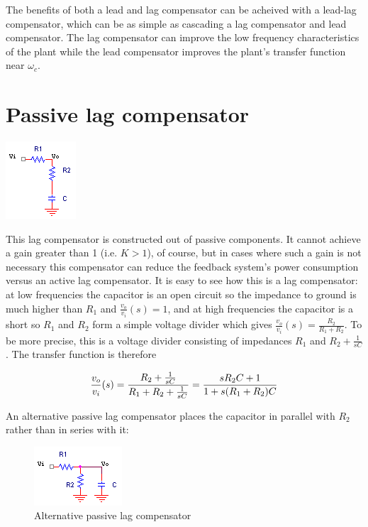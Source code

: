 The benefits of both a lead and lag compensator can be acheived with a lead-lag compensator, which can be as simple as cascading a lag compensator and lead compensator.
The lag compensator can improve the low frequency characteristics of the plant while the lead compensator improves the plant's transfer function near $\omega_{c}$.

\section{Passive lag compensator}
\begin{center}
	\includegraphics{schematics/passivelag.PNG}
\end{center}
This lag compensator is constructed out of passive components. It cannot achieve a gain greater than 1 (i.e. $K > 1$), of course, but in cases where such a gain is not necessary this compensator can reduce the feedback system's power consumption versus an active lag compensator. It is easy to see how this is a lag compensator: at low frequencies the capacitor is an open circuit so the impedance to ground is much higher than $R_{1}$ and $\frac{v_{o}}{v_{i}}(s) = 1$, and at high frequencies the capacitor is a short so $R_{1}$ and $R_{2}$ form a simple voltage divider which gives $\frac{v_{o}}{v_{i}}(s) = \frac{R_{2}}{R_{1}+R_{2}}$. To be more precise, this is a voltage divider consisting of impedances $R_{1}$ and $R_{2}+\frac{1}{sC}$. The transfer function \autocite[270]{analog-design-feedback-lundberg} is therefore

\textcolor{red}{
\begin{equation}
\frac{v_o}{v_i}(s) = \frac{R_2+\frac{1}{sC}}{R_1 + R_2 + \frac{1}{sC}} = \frac{sR_2 C + 1}{1+s(R_1 + R_2)C}
\label{eq:passivelagcompensator}
\end{equation}
}

An alternative passive lag compensator places the capacitor in parallel with $R_2$ rather than in series with it:
\begin{figure}[h]
	\centering
		\includegraphics{schematics/passivelag2.PNG}
	\caption{Alternative passive lag compensator}
	\label{fig:passivelag2}
\end{figure}

